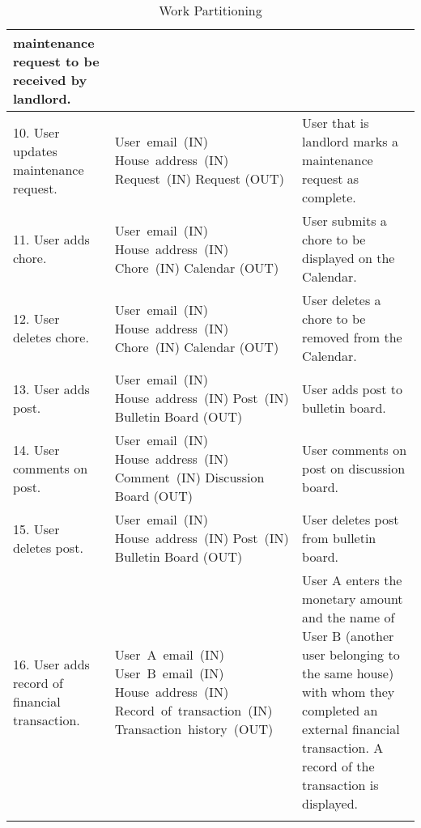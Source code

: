 \documentclass[12pt]{article}
\begin{document}
\begin{longtable}{|p{5cm}|p{5cm}|p{5cm}|}
maintenance request to be received by landlord. \\
\hline
10. User updates maintenance request. & \mbox{User email (IN)} \linebreak \mbox{House address (IN)} \linebreak \mbox{Request (IN)} \linebreak Request (OUT) & User that is landlord 
marks a maintenance request as complete. \\
\hline
11. User adds chore. & \mbox{User email (IN)} \linebreak \mbox{House address (IN)} \linebreak\mbox{Chore (IN)} 
\linebreak Calendar (OUT) & User submits a chore to be displayed 
on the Calendar. \\ \hline
12. User deletes chore. & \mbox{User email (IN)} \linebreak \mbox{House address (IN)} \linebreak\mbox{Chore (IN)} 
\linebreak Calendar (OUT) & User deletes a chore to be removed from the Calendar. \\
\hline
13. User adds post. & \mbox{User email (IN)} \linebreak \mbox{House address (IN)} \linebreak\mbox{Post (IN)} \linebreak 
Bulletin Board (OUT) & User adds post to bulletin board. \\
\hline
14. User comments on post. & \mbox{User email (IN)} \linebreak \mbox{House address (IN)} \linebreak\mbox{Comment (IN)} 
\linebreak Discussion Board (OUT) & User comments on post on discussion board. 
\\
\hline
15. User deletes post. & \mbox{User email (IN)} \linebreak \mbox{House address (IN)} \linebreak\mbox{Post (IN)} \linebreak 
Bulletin Board (OUT) & User deletes post from bulletin board. \\
\hline
16. User adds record of financial transaction. & \mbox{User A email (IN)} \linebreak \mbox{User B email (IN)} \linebreak \mbox{House address (IN)} \linebreak \mbox{Record of transaction (IN)} \linebreak \mbox{Transaction history (OUT)} & User A enters the monetary amount and the name of User B (another user belonging to the same house) with whom they completed an external financial transaction. A record of the transaction is 
displayed. \\
\hline
\caption{Work Partitioning}
\label{tab:workpartition}
\end{longtable}
	
\end{document}
